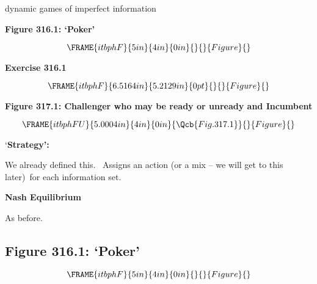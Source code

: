 \documentclass{article}
\begin{document}
dynamic games of imperfect information

\textbf{Figure 316.1: `Poker'}

\[
\FRAME{itbphF}{5in}{4in}{0in}{}{}{Figure}{\special{language "Scientific
Word";type "GRAPHIC";maintain-aspect-ratio TRUE;display "USEDEF";valid_file
"T";width 5in;height 4in;depth 0in;original-width 4.6799in;original-height
3.584in;cropleft "0";croptop "1";cropright "1";cropbottom "0";tempfilename
'JSH1WS00.wmf';tempfile-properties "XPR";}} 
\]

\bigskip

\textbf{Exercise 316.1}

\[
\FRAME{itbphF}{6.5164in}{5.2129in}{0pt}{}{}{Figure}{\special{language
"Scientific Word";type "GRAPHIC";maintain-aspect-ratio TRUE;display
"USEDEF";valid_file "T";width 6.5164in;height 5.2129in;depth
0pt;original-width 7.32in;original-height 5.0087in;cropleft "0";croptop
"1";cropright "1";cropbottom "0";tempfilename
'JSH1WS01.bmp';tempfile-properties "XP";}} 
\]

\bigskip

\textbf{Figure 317.1: Challenger who may be ready or unready and Incumbent}

\begin{equation}
\FRAME{itbphFU}{5.0004in}{4in}{0in}{\Qcb{Fig. 317.1}}{}{Figure}{\special%
{language "Scientific Word";type "GRAPHIC";maintain-aspect-ratio
TRUE;display "USEDEF";valid_file "T";width 5.0004in;height 4in;depth
0in;original-width 5.6886in;original-height 3.5201in;cropleft "0";croptop
"1";cropright "1";cropbottom "0";tempfilename
'JSH1WS02.wmf';tempfile-properties "XPR";}}
\end{equation}

\bigskip

`\textbf{Strategy':}

We already defined this. \ Assigns an action (or a mix -- we will get to
this later)\ for each information set.

\bigskip

\textbf{Nash Equilibrium }

As before.

\bigskip

\subsection{Figure 316.1: `Poker'}

\begin{equation}
\FRAME{itbphF}{5in}{4in}{0in}{}{}{Figure}{\special{language "Scientific
Word";type "GRAPHIC";maintain-aspect-ratio TRUE;display "USEDEF";valid_file
"T";width 5in;height 4in;depth 0in;original-width 4.6799in;original-height
3.584in;cropleft "0";croptop "1";cropright "1";cropbottom "0";tempfilename
'JSH1WT03.wmf';tempfile-properties "XPR";}}
\end{equation}
\end{document}
